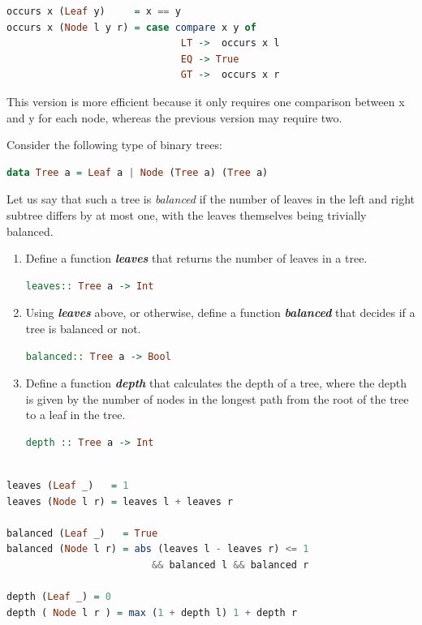 \documentclass{article}
\begin{document}
\begin{solution}
\begin{lstlisting}[language=Haskell]
occurs x (Leaf y)     = x == y
occurs x (Node l y r) = case compare x y of
                              LT ->  occurs x l
                              EQ -> True
                              GT ->  occurs x r
 \end{lstlisting}
                           
This version is more efficient because it only requires one comparison between x and y for each node, whereas the previous version may require two.
\end{solution}
\begin{exercise}
Consider the following type of binary trees: \\
\begin{lstlisting}[language=Haskell]
data Tree a = Leaf a | Node (Tree a) (Tree a) 
\end{lstlisting}
Let us say that such a tree is \textit{balanced} if the number of leaves in the left and right subtree differs by at most one, with the leaves themselves being trivially balanced. 
\begin{enumerate}
\item Define a function \textbf{\textit{leaves}} that returns the number of leaves in a tree.
\begin{lstlisting}[language=Haskell]
leaves:: Tree a -> Int
\end{lstlisting}
\item Using \textbf{\textit{leaves}} above, or otherwise, define a function \textbf{\textit{balanced}} that decides if a tree is balanced or not. 
\begin{lstlisting}[language=Haskell]
balanced:: Tree a -> Bool
\end{lstlisting}
\item 
Define a function  \textbf{\textit{depth}} that calculates the depth of a tree, where the depth is given by the number of nodes in the longest path from the root of the tree to a leaf in the tree. 
\begin{lstlisting}[language=Haskell]
depth :: Tree a -> Int
\end{lstlisting}

\end{enumerate}
\end{exercise}

\begin{solution}
\begin{lstlisting}[language=Haskell]

leaves (Leaf _)   = 1
leaves (Node l r) = leaves l + leaves r

balanced (Leaf _)   = True
balanced (Node l r) = abs (leaves l - leaves r) <= 1
                         && balanced l && balanced r
                         
depth (Leaf _) = 0
depth ( Node l r ) = max (1 + depth l) 1 + depth r
\end{lstlisting}
\end{solution}
\end{document}
